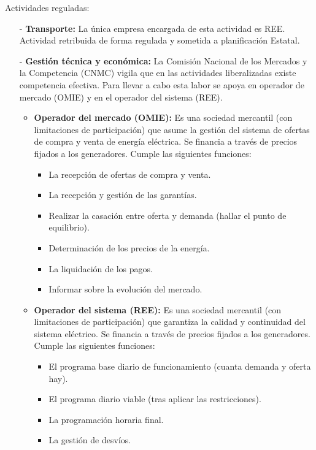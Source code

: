Actividades reguladas:
\begin{itemize}
	\item [-] \textbf{Transporte:} La única empresa encargada de esta actividad es REE. Actividad retribuida de forma regulada y sometida a planificación Estatal.
	\item [-] \textbf{Gestión técnica y económica:} La Comisión Nacional de los Mercados y la Competencia (CNMC) vigila que en las actividades liberalizadas existe competencia efectiva. Para llevar a cabo esta labor se apoya en operador de mercado (OMIE) y en el operador del sistema (REE).
	\begin{itemize}
		\item \textbf{Operador del mercado (OMIE):} Es una sociedad mercantil (con limitaciones de participación) que asume la gestión del sistema de ofertas de compra y venta de energía eléctrica. Se financia a través de precios fijados a los generadores. Cumple las siguientes funciones:
		\begin{itemize}
			\item La recepción de ofertas de compra y venta.
			\item La recepción y gestión de las garantías.
			\item Realizar la casación entre oferta y demanda (hallar el punto de equilibrio).
			\item Determinación de los precios de la energía.
			\item La liquidación de los pagos.
			\item Informar sobre la evolución del mercado.
		\end{itemize}
		\item \textbf{Operador del sistema (REE):} Es una sociedad mercantil (con limitaciones de participación) que garantiza la calidad y continuidad del sistema eléctrico. Se financia a través de precios fijados a los generadores. Cumple las siguientes funciones:
		\begin{itemize}
			\item El programa base diario de funcionamiento (cuanta demanda y oferta hay).
			\item El programa diario viable (tras aplicar las restricciones).
			\item La programación horaria final.
			\item La gestión de desvíos.
		\end{itemize}
	\end{itemize}
\end{itemize}

